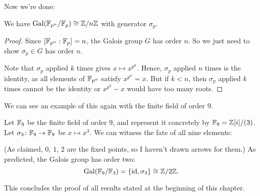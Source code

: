 Now we're done:
\begin{theorem}
	We have $\operatorname{Gal}(\mathbb F_{p^n}/\mathbb F_p) \cong \mathbb Z/n\mathbb Z$ with generator $\sigma_p$.
\end{theorem}
\begin{proof}
	Since $[\mathbb F_{p^n}:\mathbb F_p] = n$, the Galois group $G$ has order $n$.
	So we just need to show $\sigma_p \in G$ has order $n$.

	Note that $\sigma_p$ applied $k$ times gives $x \mapsto x^{p^k}$.
	Hence, $\sigma_p$ applied $n$ times is the identity,
	as all elements of $\mathbb F_{p^n}$ satisfy $x^{p^n}=x$.
	But if $k < n$, then $\sigma_p$ applied $k$ times
	cannot be the identity or $x^{p^k}-x$ would have too many roots.
\end{proof}

We can see an example of this again with the finite field of order $9$.
\begin{example}
	Let $\mathbb F_9$ be the finite field of order $9$,
	and represent it concretely by $\mathbb F_9 = \mathbb Z[i]/(3)$.
	Let $\sigma_3 \colon \mathbb F_9 \to \mathbb F_9$ be $x \mapsto x^3$.
	We can witness the fate of all nine elements:
	\begin{center}
	\end{center}
	(As claimed, $0$, $1$, $2$ are the fixed points,
	so I haven't drawn arrows for them.)
	As predicted, the Galois group has order two:
	\[ \operatorname{Gal}(\mathbb F_9/\mathbb F_3) = \left\{ \mathrm{id}, \sigma_3 \right\} \cong \mathbb Z/2\mathbb Z. \]
\end{example}

This concludes the proof of all results stated at the beginning of this chapter.

